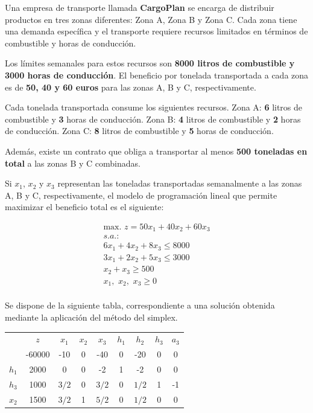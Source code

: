Una empresa de transporte llamada \textbf{CargoPlan} se encarga de distribuir productos en tres zonas diferentes: Zona A, Zona B y Zona C. 
Cada zona tiene una demanda específica y el transporte requiere recursos limitados en términos de combustible y horas de conducción.

Los límites semanales para estos recursos son \textbf{8000 litros de combustible y 3000 horas de conducción}. El beneficio por tonelada transportada a cada zona es de \textbf{50, 40 y 60 euros} para las zonas A, B y C, respectivamente.

Cada tonelada transportada consume los siguientes recursos. Zona A: \textbf{6} litros de combustible y \textbf{3} horas de conducción. Zona B: \textbf{4} litros de combustible y \textbf{2} horas de conducción. Zona C: \textbf{8} litros de combustible y \textbf{5} horas de conducción.

Además, existe un contrato que obliga a transportar al menos \textbf{500 toneladas en total} a las zonas B y C combinadas.


Si $x_1$, $x_2$ y $x_3$ representan las toneladas transportadas semanalmente a las zonas A, B y C, respectivamente, el modelo de programación lineal que permite maximizar el beneficio total es el siguiente:

\begin{equation}
\begin{split}
\mbox{max. } z = 50x_1 + 40x_2 + 60x_3\\
s.a.:\\
6x_1 + 4x_2 + 8x_3 \leq 8000\\
3x_1 + 2x_2 + 5x_3 \leq 3000\\
        x_2 +  x_3 \geq 500\\
x_1,\,\,x_2,\,\,x_3\geq 0\\
\end{split}
\end{equation}

Se dispone de la siguiente tabla, correspondiente a una solución obtenida mediante la aplicación del método del simplex.

\begin{center}
\begin{tabular}{c|c|ccccccc|}
 & $z$ & $x_1$ & $x_2$ & $x_3$ & $h_1$ & $h_2$ & $h_3$ & $a_3$\\ 
 & -60000 & -10 & 0 & -40 & 0 & -20 & 0 & 0 \\ 
\hline
$h_1$ & 2000  & 0 & 0 & -2 & 1 & -2 & 0 & 0\\ 
$h_3$ & 1000  & $3/2$ & 0 & $3/2$ & 0 & $1/2$ & 1 & -1\\ 
$x_2$ & 1500  & $3/2$ & 1 & $5/2$ & 0 & $1/2$ & 0 & 0\\ 
\hline
\end{tabular}
\end{center}





